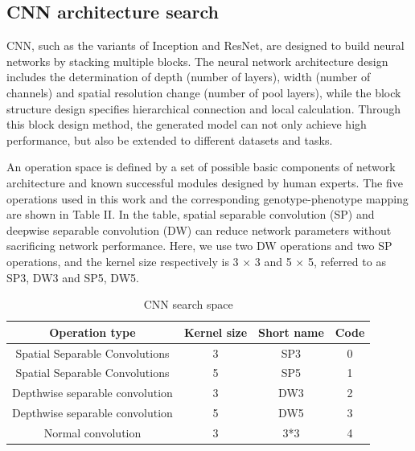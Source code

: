 \documentclass[lettersize,journal]{IEEEtran}
\begin{document}
\subsection{CNN architecture search}
CNN, such as the variants of Inception and ResNet, are designed to build neural networks by stacking multiple blocks. The neural network architecture design includes the determination of depth (number of layers), width (number of channels) and spatial resolution change (number of pool layers), while the block structure design specifies hierarchical connection and local calculation. Through this block design method, the generated model can not only achieve high performance, but also be extended to different datasets and tasks.

An operation space is defined by a set of possible basic components of network architecture and known successful modules designed by human experts. The five operations used in this work and the corresponding genotype-phenotype mapping are shown in Table II. In the table, spatial separable convolution (SP) and deepwise separable convolution (DW) can reduce network parameters without sacrificing network performance. Here, we use two DW operations and two SP operations, and the kernel size respectively is 3 × 3 and 5 × 5, referred to as SP3, DW3 and SP5, DW5.

\begin{table}[!t]
\caption{CNN search space\label{table2}}
\centering
\begin{tabular}{cccc}
\hline
Operation type & Kernel size & Short name & Code\\
\hline
Spatial Separable Convolutions	 & 3 & SP3 & 0\\
Spatial Separable Convolutions	 & 5 & SP5 & 1\\
Depthwise separable convolution & 3 & DW3 & 2\\
Depthwise separable convolution & 5 & DW5 & 3\\
Normal convolution & 3 & 3*3 & 4\\
\hline
\end{tabular}
\end{table}
\end{document}
